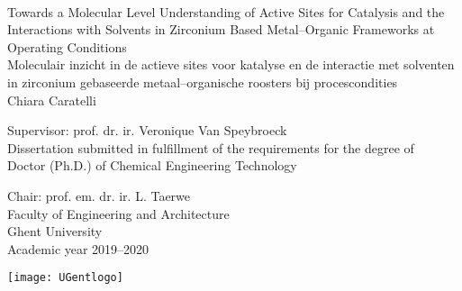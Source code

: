 \documentclass[10pt,twoside]{book}
\begin{document}


% 
 \thispagestyle{empty}   %
% 
\graphicspath{{figures/}}


\newpage\null\thispagestyle{empty}
\newpage\null\thispagestyle{empty}\newpage
\thispagestyle{empty}
% 


{\large \ \vspace{0.25\textheight} \\

\hspace{-\parindent}Towards a Molecular Level Understanding of Active Sites for Catalysis and the Interactions with Solvents in Zirconium Based Metal--Organic Frameworks at Operating Conditions\\

\hspace{-\parindent}Moleculair inzicht in de actieve sites voor katalyse en de interactie met solventen in zirconium gebaseerde metaal--organische roosters bij procescondities\\


\vspace{0.5cm}
\hspace{-\parindent}Chiara Caratelli}

\vspace*{\fill}
\hspace{-\parindent}Supervisor: prof. dr. ir.  Veronique Van Speybroeck \\
\hspace{-\parindent}Dissertation submitted in fulfillment of the requirements
 for the degree of\\
\hspace{-\parindent}Doctor (Ph.D.) of Chemical Engineering Technology\\



\vspace{0.5cm}

 \hspace{-\parindent}\begin{minipage}{0.7\textwidth}
 \hspace{-\parindent}Chair: prof. em. dr. ir. L. Taerwe \\
  \hspace{-\parindent}Faculty of Engineering and Architecture\\
  \hspace{-\parindent}Ghent University\\
  \hspace{-\parindent}Academic year 2019--2020
\end{minipage}
\begin{minipage}{0.3\textwidth}
  \begin{flushright}
    \texttt{[image: UGentlogo]}
  \end{flushright}
\end{minipage}
\end{document}
